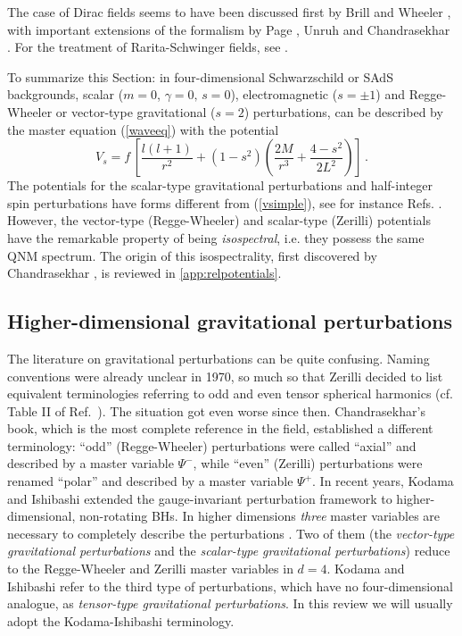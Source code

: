 \documentclass[]{iopart}
\def\be{\begin{equation}}
\def\ee{\end{equation}}
\begin{document}
The case of Dirac fields seems to have been discussed first by Brill and
Wheeler \cite{Brill:1957fx}, with important extensions of the formalism by
Page \cite{Page:1976df}, Unruh \cite{Unruh:1976fm} and Chandrasekhar
\cite{MTB}. For the treatment of Rarita-Schwinger fields, see \cite{castillo}.

To summarize this Section: in four-dimensional Schwarzschild or SAdS
backgrounds, scalar ($m=0$, $\gamma=0,\,s=0$), electromagnetic ($s=\pm 1$) and
Regge-Wheeler or vector-type gravitational ($s=2$) perturbations, can be
described by the master equation (\ref{waveeq}) with the potential
%
\be
V_{s}=f\,\left[\frac{l(l+1)}{r^2}+(1-s^2)\left (\frac{2M}{r^3}+\frac{4-s^2}{2L^2}\right )\right] \label{vsimple}\,.
\ee
%
The potentials for the scalar-type gravitational perturbations and
half-integer spin perturbations have forms different from (\ref{vsimple}), see
for instance Refs. \cite{Kodama:2003jz,Cho:2003qe}.  However, the vector-type
(Regge-Wheeler) and scalar-type (Zerilli) potentials have the remarkable
property of being {\em isospectral}, i.e. they possess the same QNM
spectrum. The origin of this isospectrality, first discovered by Chandrasekhar
\cite{MTB}, is reviewed in \ref{app:relpotentials}.

\subsection{Higher-dimensional gravitational perturbations}

The literature on gravitational perturbations can be quite confusing. Naming
conventions were already unclear in 1970, so much so that Zerilli decided to
list equivalent terminologies referring to odd and even tensor spherical
harmonics (cf. Table II of Ref.~\cite{Zerilli:1971wd}). The situation got even
worse since then. Chandrasekhar's book, which is the most complete reference
in the field, established a different terminology: ``odd'' (Regge-Wheeler)
perturbations were called ``axial'' and described by a master variable
$\Psi^-$, while ``even'' (Zerilli) perturbations were renamed ``polar'' and
described by a master variable $\Psi^{+}$. In recent years, Kodama and
Ishibashi \cite{Kodama:2003jz,Ishibashi:2003ap,Kodama:2003kk} extended the
gauge-invariant perturbation framework to higher-dimensional, non-rotating
BHs. In higher dimensions {\it three} master variables are necessary to
completely describe the perturbations \cite{Kodama:2003jz}. Two of them (the
{\it vector-type gravitational perturbations} and the {\it scalar-type
  gravitational perturbations}) reduce to the Regge-Wheeler and Zerilli master
variables in $d=4$. Kodama and Ishibashi refer to the third type of
perturbations, which have no four-dimensional analogue, as {\it tensor-type
  gravitational perturbations}.  In this review we will usually adopt the
Kodama-Ishibashi terminology.
\end{document}
